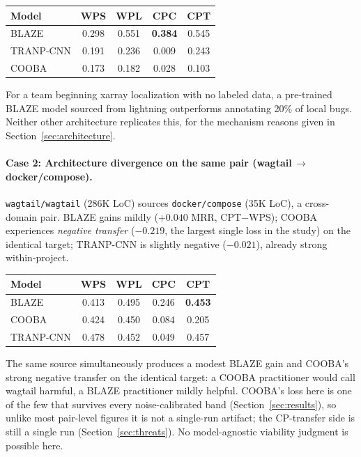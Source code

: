 \documentclass[a4paper,fleqn]{cas-dc}
\begin{document}
\begin{center}
\small
\begin{tabular}{lcccc}
\toprule
Model & WPS & WPL & CPC & CPT \\ \midrule
BLAZE     & 0.298 & 0.551 & \textbf{0.384} & 0.545 \\
TRANP-CNN & 0.191 & 0.236 & 0.009 & 0.243 \\
COOBA     & 0.173 & 0.182 & 0.028 & 0.103 \\ \bottomrule
\end{tabular}
\end{center}

\noindent For a team beginning xarray localization with no labeled data, a
pre-trained BLAZE model sourced from lightning outperforms annotating 20\% of
local bugs. Neither other architecture replicates this, for the mechanism
reasons given in Section~\ref{sec:architecture}.

\paragraph{Case 2: Architecture divergence on the same pair (wagtail\,$\to$\,docker/compose).}
\texttt{wagtail/wagtail} (286K LoC) sources \texttt{docker/compose} (35K LoC),
a cross-domain pair. BLAZE gains mildly ($+0.040$ MRR, CPT$-$WPS); COOBA experiences
\emph{negative transfer} ($-0.219$, the largest single loss in the study) on
the identical target; TRANP-CNN is
slightly negative ($-0.021$), already strong within-project.

\begin{center}
\small
\begin{tabular}{lcccc}
\toprule
Model     & WPS   & WPL   & CPC   & CPT \\ \midrule
BLAZE     & 0.413 & 0.495 & 0.246 & \textbf{0.453} \\
COOBA     & 0.424 & 0.450 & 0.084 & 0.205 \\
TRANP-CNN & 0.478 & 0.452 & 0.049 & 0.457 \\ \bottomrule
\end{tabular}
\end{center}
\noindent The same source simultaneously produces a modest BLAZE gain and
COOBA's strong negative transfer on the identical target: a COOBA practitioner would
call wagtail harmful, a BLAZE practitioner mildly helpful. COOBA's loss here
is one of the few that survives every noise-calibrated band
(Section~\ref{sec:results}), so unlike most pair-level figures it is not a
single-run artifact; the CP-transfer side is still a single run
(Section~\ref{sec:threats}). No model-agnostic viability judgment is possible
here.
\end{document}
